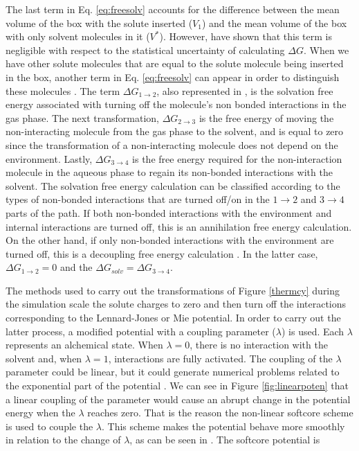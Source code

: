     The last term in Eq. \ref{eq:freesolv} accounts for the difference between the mean volume of the box with the solute inserted ($V_{1}$) and the mean volume of the box with only solvent molecules in it ($V^{*}$). However,  have shown that this term is negligible with respect to the statistical uncertainty of calculating $\Delta G$. When we have other solute molecules that are equal to the solute molecule being inserted in the box, another term in Eq. \ref{eq:freesolv} can appear in order to distinguish these molecules \cite{shirts2013}. The  term $\Delta G_{1 \rightarrow 2}$, also represented in ,  is the solvation free energy associated with turning off the molecule's non bonded interactions in the gas phase. The next transformation, $\Delta G_{2 \rightarrow 3}$ is the free energy of moving the non-interacting molecule from the gas phase to the solvent, and is equal to zero since the transformation of a non-interacting molecule does not depend on the environment. Lastly, $\Delta G_{3 \rightarrow 4}$ is the free energy required for the non-interaction molecule in the aqueous phase to regain its non-bonded interactions with the solvent.  The solvation free energy calculation can be classified according to the types of non-bonded interactions that are turned off/on in the $1 \rightarrow 2$ and $ 3 \rightarrow 4$ parts of the path. If both non-bonded interactions with the environment and internal interactions are turned off, this is an annihilation free energy calculation. On the other hand, if only non-bonded interactions with the environment are turned off, this is a decoupling free energy calculation \cite{klimovich}. In the latter case, $\Delta G_{1 \rightarrow 2} = 0$ and the $\Delta G_{solv} = \Delta G_{3 \rightarrow 4} $.  
    
    The methods used to carry out the transformations of Figure \ref{thermcy} during the simulation scale the solute charges to zero and then turn off the interactions corresponding to the Lennard-Jones or Mie potential. In order to carry out the latter process, a modified potential with a coupling parameter ($\lambda$) is used. Each $\lambda$ represents an alchemical state. When $\lambda=0$, there is no interaction with the solvent and, when $\lambda=1$, interactions are fully activated. The coupling of the $\lambda$ parameter could be linear, but it could generate numerical problems related to the exponential part of the potential \cite{shirts2013}. We can see in Figure \ref{fig:linearpoten} that a linear coupling of the parameter would cause an abrupt change in the potential energy when the $\lambda$ reaches zero. That is the reason the non-linear softcore scheme \cite{beutler1994} is used to couple the $\lambda$. This scheme makes the potential behave more smoothly in relation to the change of $\lambda$, as can be seen in . The softcore potential is  
    
